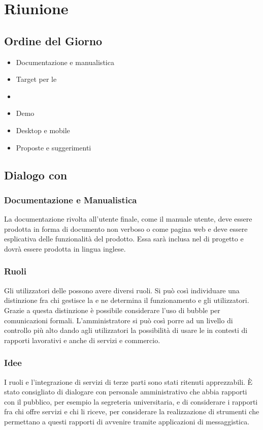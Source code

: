\section{Riunione}
\subsection{Ordine del Giorno}
\begin{itemize}
	\item Documentazione e manualistica
	\item Target per le 
	\item {}
	\item Demo
	\item Desktop e mobile
	\item Proposte e suggerimenti
\end{itemize}

\subsection{Dialogo con \Proponente}
\subsubsection{Documentazione e Manualistica}
La documentazione rivolta all'utente finale, come il manuale utente, deve  essere prodotta in forma di documento non verboso o come pagina web e deve essere esplicativa delle funzionalità del prodotto. 
Essa sarà inclusa nel  di progetto e dovrà essere prodotta in lingua inglese.

\subsubsection{Ruoli}
Gli utilizzatori delle  possono avere diversi ruoli. Si può così individuare una distinzione fra chi gestisce la  e ne determina il funzionamento e gli utilizzatori.
Grazie a questa distinzione è possibile considerare l'uso di bubble  per comunicazioni formali. 
L'amministratore si può così porre ad un livello di controllo più alto dando agli utilizzatori la possibilità di usare le  in contesti di rapporti lavorativi e anche di servizi e commercio.

\subsubsection{Idee}
I ruoli e l'integrazione di servizi di terze parti sono stati ritenuti apprezzabili.
\`{E} stato consigliato di dialogare con personale amministrativo che abbia rapporti con il pubblico, per esempio la segreteria universitaria, e di considerare i rapporti fra chi offre servizi e chi li riceve, per considerare la realizzazione di strumenti che permettano a questi rapporti di avvenire tramite applicazioni di messaggistica.  

